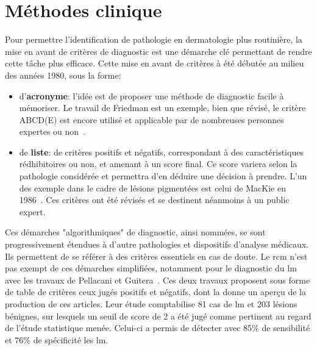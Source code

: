 \section{Méthodes clinique}
\label{sec:clinical_methods}
Pour permettre l'identification de pathologie en dermatologie plus routinière, la mise en avant de critères de diagnostic est une démarche clé permettant de rendre cette tâche plus efficace. Cette mise en avant de critères à été débutée au milieu des années 1980, sous la forme:
\begin{itemize}
    \item d'\textbf{acronyme}: l'idée est de proposer une méthode de diagnostic facile à mémoriser. Le travail de Friedman est un exemple, bien que révisé, le critère ABCD(E) est encore utilisé et applicable par de nombreuses personnes expertes ou non~\cite{Friedman1985}.
    \item de \textbf{liste}: de critères positifs et négatifs, correspondant à des caractéristiques rédhibitoires ou non, et amenant à un score final. Ce score variera selon la pathologie considérée et permettra d'en déduire une décision à prendre. L'un des exemple dans le cadre de lésions pigmentées est celui de MacKie en 1986~\cite{mackie1986}. Ces critères ont été révisés et se destinent néanmoins à un public expert. 
\end{itemize}\par

Ces démarches "algorithmiques" de diagnostic, ainsi nommées, se sont progressivement étendues à d'autre pathologies et dispositifs d'analyse médicaux. Ils permettent de se référer à des critères essentiels en cas de doute. Le \gls{rcm} n'est pas exempt de ces démarches simplifiées, notamment pour le diagnostic du \gls{lm} avec les travaux de Pellacani et Guitera~\cite{Pellacani2007, Guitera2010}. Ces deux travaux proposent sous forme de table de critères ceux jugés positifs et négatifs, dont la  donne un aperçu de la production de ces articles. Leur étude comptabilise 81 cas de \gls{lm} et 203 lésions bénignes, sur lesquels un seuil de score de 2 a été jugé comme pertinent au regard de l'étude statistique menée. Celui-ci a permis de détecter avec 85\% de sensibilité et 76\% de spécificité les \gls{lm}.\par

